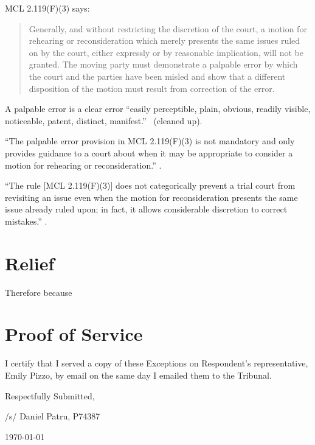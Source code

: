 \documentclass[12pt,\documentclassflag]{michiganCourtOfAppealsBrief}
\begin{document}
MCL 2.119(F)(3) says:

\begin{quote}
  Generally, and without restricting the discretion of the court, a motion for rehearing or reconsideration which merely presents the same issues ruled on by the court, either expressly or by reasonable implication, will not be granted. The moving party must demonstrate a palpable error by which the court and the parties have been misled and show that a different disposition of the motion must result from correction of the error.
\end{quote}

 A palpable error is a clear error ``easily perceptible, plain, obvious, readily
 visible, noticeable, patent, distinct, manifest.'' \ (cleaned up).
 
``The palpable error provision in MCL 2.119(F)(3)  is not mandatory and only provides guidance to
a court about when it may be appropriate to consider a motion for rehearing or reconsideration.''
.

``The rule [MCL 2.119(F)(3)] does not categorically prevent a trial court from revisiting an issue even when the motion for reconsideration presents the same issue already ruled upon; in fact, it allows considerable discretion to correct mistakes.'' . 








\section{Relief}

Therefore because


\section{Proof of Service}

I certify that I served a copy of these Exceptions on Respondent's representative, Emily Pizzo, by email on the same day I emailed them to the Tribunal.

\vspace{1\baselineskip}

{ \setlength{\leftskip}{3.5in}

  Respectfully Submitted,

  /s/ Daniel Patru, P74387

\today

  \setlength{\leftskip}{0pt}}

\newpage\empty%
\end{document}
